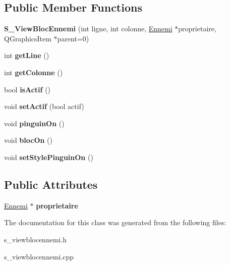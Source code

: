 \subsection*{Public Member Functions}
\begin{DoxyCompactItemize}
\item 
\hypertarget{class_s___view_bloc_ennemi_a61ac9969081699f9cc22f89dcfdba2e6}{}{\bfseries S\+\_\+\+View\+Bloc\+Ennemi} (int ligne, int colonne, \hyperlink{class_ennemi}{Ennemi} $\ast$proprietaire, Q\+Graphics\+Item $\ast$parent=0)\label{class_s___view_bloc_ennemi_a61ac9969081699f9cc22f89dcfdba2e6}

\item 
\hypertarget{class_s___view_bloc_ennemi_af570c3ab5ad404591829ef8bbed13b08}{}int {\bfseries get\+Line} ()\label{class_s___view_bloc_ennemi_af570c3ab5ad404591829ef8bbed13b08}

\item 
\hypertarget{class_s___view_bloc_ennemi_ae843182fc545b9c84c22322873e499cd}{}int {\bfseries get\+Colonne} ()\label{class_s___view_bloc_ennemi_ae843182fc545b9c84c22322873e499cd}

\item 
\hypertarget{class_s___view_bloc_ennemi_a5aef2bd784ad1c7c180de4f5608a9624}{}bool {\bfseries is\+Actif} ()\label{class_s___view_bloc_ennemi_a5aef2bd784ad1c7c180de4f5608a9624}

\item 
\hypertarget{class_s___view_bloc_ennemi_a976bc517403eeef48f2e7d8bb67dfa99}{}void {\bfseries set\+Actif} (bool actif)\label{class_s___view_bloc_ennemi_a976bc517403eeef48f2e7d8bb67dfa99}

\item 
\hypertarget{class_s___view_bloc_ennemi_a3c6bb606eaf348d513caf0bfd73fd0aa}{}void {\bfseries pinguin\+On} ()\label{class_s___view_bloc_ennemi_a3c6bb606eaf348d513caf0bfd73fd0aa}

\item 
\hypertarget{class_s___view_bloc_ennemi_a930acab8e21620c59f18144230a9a33d}{}void {\bfseries bloc\+On} ()\label{class_s___view_bloc_ennemi_a930acab8e21620c59f18144230a9a33d}

\item 
\hypertarget{class_s___view_bloc_ennemi_a215944e297397346d3d5c0a08ae3d1fb}{}void {\bfseries set\+Style\+Pinguin\+On} ()\label{class_s___view_bloc_ennemi_a215944e297397346d3d5c0a08ae3d1fb}

\end{DoxyCompactItemize}
\subsection*{Public Attributes}
\begin{DoxyCompactItemize}
\item 
\hypertarget{class_s___view_bloc_ennemi_a85aabc73d2414af643c1d6e65a3384f5}{}\hyperlink{class_ennemi}{Ennemi} $\ast$ {\bfseries proprietaire}\label{class_s___view_bloc_ennemi_a85aabc73d2414af643c1d6e65a3384f5}

\end{DoxyCompactItemize}


The documentation for this class was generated from the following files\+:\begin{DoxyCompactItemize}
\item 
s\+\_\+viewblocennemi.\+h\item 
s\+\_\+viewblocennemi.\+cpp\end{DoxyCompactItemize}
